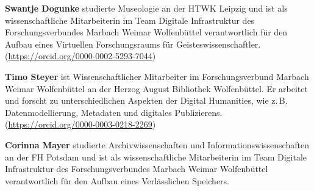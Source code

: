 \documentclass[a4paper,
fontsize=11pt,
oneside,
numbers=noperiodatend,
parskip=half-,
bibliography=totoc,
final
]{scrartcl}
\begin{document}
\textbf{Swantje Dogunke} studierte Museologie an der HTWK Leipzig und
ist als wissenschaftliche Mitarbeiterin im Team Digitale Infrastruktur
des Forschungsverbundes Marbach Weimar Wolfenbüttel verantwortlich für
den Aufbau eines Virtuellen Forschungsraums für Geisteswissenschaftler.
(\href{https://orcid.org/0000-0002-5293-7044}{https://orcid.org/0000-0002-5293-7044})

\textbf{Timo Steyer} ist Wissenschaftlicher Mitarbeiter im
Forschungsverbund Marbach Weimar Wolfenbüttel an der Herzog August
Bibliothek Wolfenbüttel. Er arbeitet und forscht zu unterschiedlichen
Aspekten der Digital Humanities, wie z.\,B. Datenmodellierung, Metadaten
und digitales Publizierens. (\href{https://orcid.org/0000-0003-0218-2269}{https://orcid.org/0000-0003-0218-2269})

\textbf{Corinna Mayer} studierte Archivwissenschaften und
Informationswissenschaften an der FH Potsdam und ist als
wissenschaftliche Mitarbeiterin im Team Digitale Infrastruktur des
Forschungsverbundes Marbach Weimar Wolfenbüttel verantwortlich für den
Aufbau eines Verlässlichen Speichers.
\end{document}
